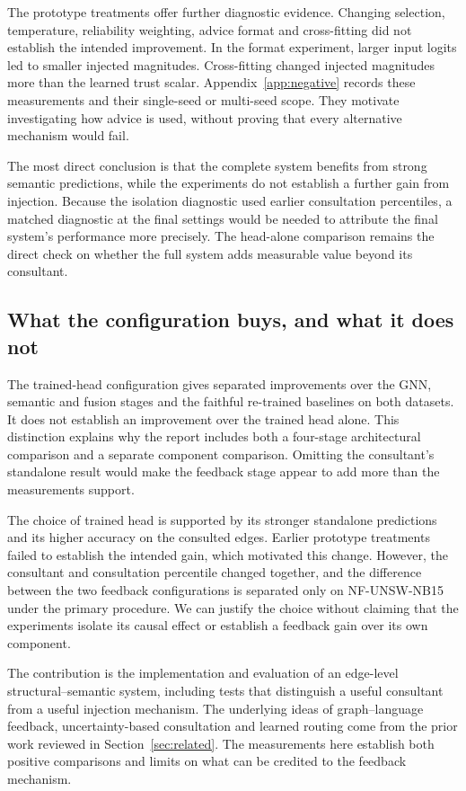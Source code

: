 The prototype treatments offer further diagnostic evidence. Changing selection, temperature, reliability weighting, advice format and cross-fitting did not establish the intended improvement. In the format experiment, larger input logits led to smaller injected magnitudes. Cross-fitting changed injected magnitudes more than the learned trust scalar. Appendix~\ref{app:negative} records these measurements and their single-seed or multi-seed scope. They motivate investigating how advice is used, without proving that every alternative mechanism would fail.

The most direct conclusion is that the complete system benefits from strong semantic predictions, while the experiments do not establish a further gain from injection. Because the isolation diagnostic used earlier consultation percentiles, a matched diagnostic at the final settings would be needed to attribute the final system's performance more precisely. The head-alone comparison remains the direct check on whether the full system adds measurable value beyond its consultant.

\subsection{What the configuration buys, and what it does not}
\label{sec:disc-contribution}

The trained-head configuration gives separated improvements over the GNN, semantic and fusion stages and the faithful re-trained baselines on both datasets. It does not establish an improvement over the trained head alone. This distinction explains why the report includes both a four-stage architectural comparison and a separate component comparison. Omitting the consultant's standalone result would make the feedback stage appear to add more than the measurements support.

The choice of trained head is supported by its stronger standalone predictions and its higher accuracy on the consulted edges. Earlier prototype treatments failed to establish the intended gain, which motivated this change. However, the consultant and consultation percentile changed together, and the difference between the two feedback configurations is separated only on NF-UNSW-NB15 under the primary procedure. We can justify the choice without claiming that the experiments isolate its causal effect or establish a feedback gain over its own component.

The contribution is the implementation and evaluation of an edge-level structural--semantic system, including tests that distinguish a useful consultant from a useful injection mechanism. The underlying ideas of graph--language feedback, uncertainty-based consultation and learned routing come from the prior work reviewed in Section~\ref{sec:related}. The measurements here establish both positive comparisons and limits on what can be credited to the feedback mechanism.

